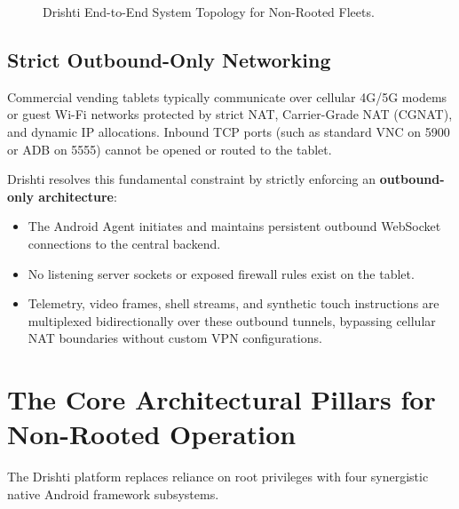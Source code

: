\documentclass[11pt,a4paper]{article}
\begin{document}
\begin{figure}[htbp]
{%
}
\caption{Drishti End-to-End System Topology for Non-Rooted Fleets.}
\label{fig:arch}
\end{figure}

\subsection{Strict Outbound-Only Networking}
Commercial vending tablets typically communicate over cellular 4G/5G modems or guest Wi-Fi networks protected by strict NAT, Carrier-Grade NAT (CGNAT), and dynamic IP allocations. Inbound TCP ports (such as standard VNC on 5900 or ADB on 5555) cannot be opened or routed to the tablet.

Drishti resolves this fundamental constraint by strictly enforcing an \textbf{outbound-only architecture}:
\begin{itemize}[leftmargin=*]
    \item The Android Agent initiates and maintains persistent outbound WebSocket connections to the central backend.
    \item No listening server sockets or exposed firewall rules exist on the tablet.
    \item Telemetry, video frames, shell streams, and synthetic touch instructions are multiplexed bidirectionally over these outbound tunnels, bypassing cellular NAT boundaries without custom VPN configurations.
\end{itemize}

\section{The Core Architectural Pillars for Non-Rooted Operation}

The Drishti platform replaces reliance on root privileges with four synergistic native Android framework subsystems.
\end{document}
